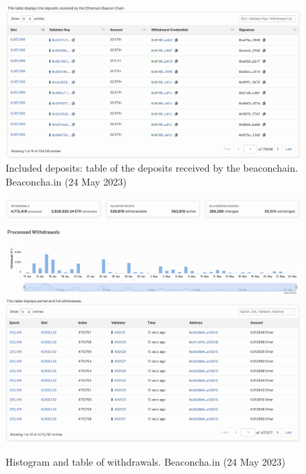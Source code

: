 \documentclass[UTF8]{article}
\begin{document}
{\begin{figure}[htbp]
\begin{center}
\includegraphics[width=0.9\linewidth]{images/bincldep}
\caption{Included deposits: table of the deposits received by the beaconchain. Beaconcha.in (24 May 2023)}
\label{fig:bincldep}
\end{center}
\end{figure}

\begin{figure}[htbp]
\begin{center}
\includegraphics[width=0.9\linewidth]{images/bwithdrawals}\\
\includegraphics[width=0.9\linewidth]{images/bwithdrawalstbl}
\caption{Histogram and table of withdrawals. Beaconcha.in (24 May 2023)}
\label{fig:bwithdrawals}
\end{center}
\end{figure}

}
\end{document}
